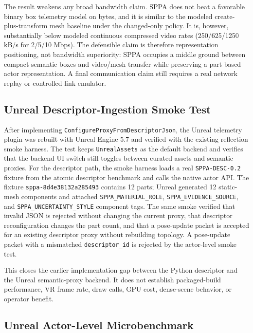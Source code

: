 ﻿\documentclass[11pt,a4paper]{article}
\begin{document}
The result weakens any broad bandwidth claim. SPPA does not beat a favorable
binary box telemetry model on bytes, and it is similar to the modeled
create-plus-transform mesh baseline under the changed-only policy. It is,
however, substantially below modeled continuous compressed video rates
(250/625/1250 kB/s for 2/5/10 Mbps). The defensible claim is therefore
representation positioning, not bandwidth superiority: SPPA occupies a middle
ground between compact semantic boxes and video/mesh transfer while preserving a
part-based actor representation. A final communication claim still requires a
real network replay or controlled link emulator.

\subsection{Unreal Descriptor-Ingestion Smoke Test}

After implementing \texttt{ConfigureProxyFromDescriptorJson}, the Unreal
telemetry plugin was rebuilt with Unreal Engine 5.7 and verified
with the existing reflection smoke harness. The test keeps
\texttt{UnrealAssets} as the default backend and verifies that the backend UI
switch still toggles between curated assets and semantic proxies. For the
descriptor path, the smoke harness loads a real
\texttt{SPPA-DESC-0.2} fixture from the atomic descriptor benchmark and calls
the native actor API. The fixture \texttt{sppa-8d4e38132a285493} contains 12
parts; Unreal generated 12 static-mesh components and attached
\texttt{SPPA\_MATERIAL\_ROLE}, \texttt{SPPA\_EVIDENCE\_SOURCE}, and
\texttt{SPPA\_UNCERTAINTY\_STYLE} component tags. The same smoke verified that
invalid JSON is rejected without changing the current proxy, that descriptor
reconfiguration changes the part count, and that a pose-update packet is
accepted for an existing descriptor proxy without rebuilding topology. A
pose-update packet with a mismatched \texttt{descriptor\_id} is rejected by the
actor-level smoke test.

This closes the earlier implementation gap between the Python descriptor and
the Unreal semantic-proxy backend. It does not establish packaged-build
performance, VR frame rate, draw calls, GPU cost, dense-scene behavior, or
operator benefit.

\subsection{Unreal Actor-Level Microbenchmark}
\end{document}
